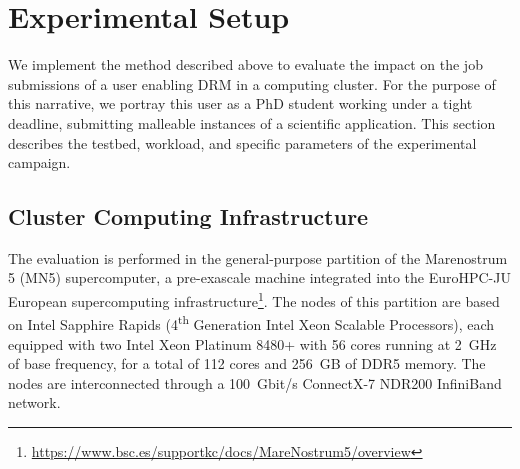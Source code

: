 \documentclass[a4paper,fleqn]{cas-dc}
\newcommand{\sergio}[1]{\textcolor{black}{#1}}
\begin{document}

\section{Experimental Setup}\label{sec:experiments}
We implement the method described above to evaluate the impact on the job submissions of a user enabling DRM in a computing cluster.
For the purpose of this narrative, we portray this user as a PhD student working under a tight deadline, submitting malleable instances of a scientific application.
This section describes the testbed, workload, and specific parameters of the experimental campaign.

\subsection{Cluster Computing Infrastructure}
\label{subsec:testbed}
The evaluation is performed in the general-purpose partition of the Marenostrum 5 (MN5) supercomputer, a pre-exascale machine integrated into the EuroHPC-JU European supercomputing infrastructure\footnote{\url{https://www.bsc.es/supportkc/docs/MareNostrum5/overview}}.
The nodes of this partition are based on Intel Sapphire Rapids (4\textsuperscript{th} Generation Intel Xeon Scalable Processors), each equipped with two Intel Xeon Platinum 8480+ with 56 cores running at 2~GHz of base frequency, for a total of 112 cores and 256~GB of DDR5 memory.
The nodes are interconnected through a 100~Gbit/s ConnectX-7 NDR200 InfiniBand network.
\end{document}

